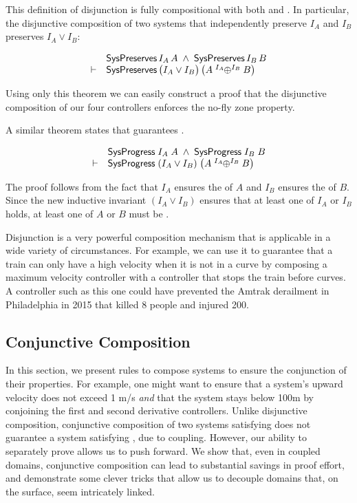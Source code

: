 This definition of disjunction is fully compositional with
both \SysPreserves and \SysNeverStuck.  In particular, the disjunctive
composition of two systems that independently preserve $I_A$ and $I_B$
preserves $I_A \vee I_B$:
\begin{theorem}{}
\[\begin{array}{rl}
       & \SysPreservesP{I_A}{A} \;\wedge\; \SysPreservesP{I_B}{B} \\
\entails & \SysPreservesP{\big(I_A \vee I_B\big)}{\big(\SysDisjoin{A}{I_A}{B}{I_B}\big)}
\end{array}
\]
\end{theorem}
\noindent
Using only this theorem we can easily construct a proof that the
disjunctive composition of our four controllers enforces the no-fly zone
property.

A similar theorem states that \disjoinop guarantees \SysNeverStuck.
\begin{theorem}{}
\[\begin{array}{rl}
       & \SysNeverStuckP{I_A}{A} \;\wedge\; \SysNeverStuckP{I_B}{B} \\
\entails & \SysNeverStuckP{(I_A \vee I_B)}{\big(\SysDisjoin{A}{I_A}{B}{I_B}\big)}
\end{array}
\]
\label{thm:progress-disjoint}
\end{theorem}
\noindent
The proof follows from the fact that $I_A$ ensures the \Enabledness of $A$
and $I_B$ ensures the \Enabledness of $B$.  Since the new inductive
invariant $\left( I_A \vee I_B\right)$ ensures that at least one of $I_A$
or $I_B$ holds, at least one of $A$ or $B$ must be \Enabled.

Disjunction is a very powerful composition mechanism that is applicable in
a wide variety of circumstances.  For example, we can use it to guarantee
that a train can only have a high velocity when it is not in a curve by
composing a maximum velocity controller with a controller that stops the
train before curves.  A controller such as this one could have prevented
the Amtrak derailment in Philadelphia in 2015 that killed 8 people and
injured 200.

\subsection{Conjunctive Composition}
\label{sec:conjunctive-composition}

In this section, we present rules to compose systems to ensure the
conjunction of their properties.  For example, one might want to ensure
that a system's upward velocity does not exceed 1 m/s \emph{and} that the
system stays below 100m by conjoining the first and second derivative
controllers.  Unlike disjunctive composition, conjunctive composition of
two systems satisfying \progress{} does not guarantee a system
satisfying \progress{}, due to coupling.  However, our ability to
separately prove \progress{} allows us to push forward.  We show that, even
in coupled domains, conjunctive composition can lead to substantial savings
in proof effort, and demonstrate some clever tricks that allow us to
decouple domains that, on the surface, seem intricately linked.

